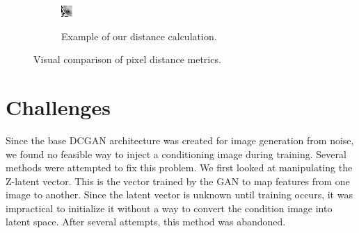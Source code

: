 \documentclass[letterpaper]{article} %
\begin{document}
\begin{figure}[h!]
\begin{subfigure}{0.22\textwidth}
\begin{center}
\begin{minipage}[t]{0.75\linewidth}
\begin{centering}
{\includegraphics[width=\linewidth]{shadow_ours.png}}
\caption{Example of our distance calculation.}
\label{fig:shadow_ours}
\end{centering}
\end{minipage}
\end{center}
\end{subfigure}
\caption{Visual comparison of pixel distance metrics.}
\label{fig:pixel_distance}
\end{figure}

\section{Challenges}
Since the base DCGAN architecture was created for image generation from noise,
we found no feasible way to inject a conditioning image during training.
Several methods were attempted to fix this problem.
We first looked at manipulating the Z-latent vector.
This is the vector trained by the GAN to map features from one image to another.
Since the latent vector is unknown until training occurs,
it was impractical to initialize it without a way to convert
the condition image into latent space.
After several attempts, this method was abandoned.
\end{document}
